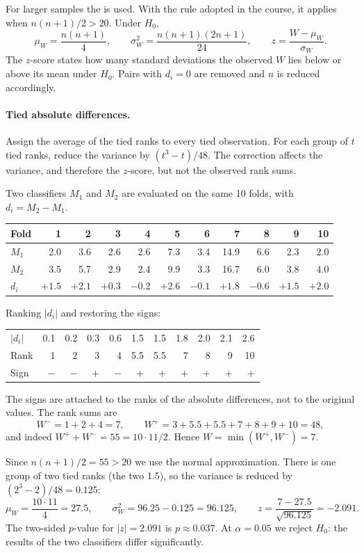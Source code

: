 For larger samples the  is used. With the rule adopted in the course, it applies when $n(n+1)/2 > 20$. Under $H_0$,
\[
  \mu_W = \frac{n(n+1)}{4}, \qquad
  \sigma_W^2 = \frac{n(n+1)(2n+1)}{24}, \qquad
  z = \frac{W - \mu_W}{\sigma_W}.
\]
The $z$-score states how many standard deviations the observed $W$ lies below or above its mean under $H_0$. Pairs with $d_i = 0$ are removed and $n$ is reduced accordingly.

\paragraph{Tied absolute differences.} Assign the average of the tied ranks to every tied observation. For each group of $t$ tied ranks, reduce the variance by $(t^3 - t)/48$. The correction affects the variance, and therefore the $z$-score, but not the observed rank sums.

\begin{example}
Two classifiers $M_1$ and $M_2$ are evaluated on the same 10 folds, with $d_i = M_2 - M_1$.
\begin{center}
\small
\begin{tabular}{lrrrrrrrrrr}
\toprule
Fold & 1 & 2 & 3 & 4 & 5 & 6 & 7 & 8 & 9 & 10 \\
\midrule
$M_1$ & 2.0 & 3.6 & 2.6 & 2.6 & 7.3 & 3.4 & 14.9 & 6.6 & 2.3 & 2.0 \\
$M_2$ & 3.5 & 5.7 & 2.9 & 2.4 & 9.9 & 3.3 & 16.7 & 6.0 & 3.8 & 4.0 \\
$d_i$ & $+1.5$ & $+2.1$ & $+0.3$ & $-0.2$ & $+2.6$ & $-0.1$ & $+1.8$ & $-0.6$ & $+1.5$ & $+2.0$ \\
\bottomrule
\end{tabular}
\end{center}
Ranking $|d_i|$ and restoring the signs:
\begin{center}
\small
\begin{tabular}{lrrrrrrrrrr}
\toprule
$|d_i|$ & 0.1 & 0.2 & 0.3 & 0.6 & 1.5 & 1.5 & 1.8 & 2.0 & 2.1 & 2.6 \\
Rank & 1 & 2 & 3 & 4 & 5.5 & 5.5 & 7 & 8 & 9 & 10 \\
Sign & $-$ & $-$ & $+$ & $-$ & $+$ & $+$ & $+$ & $+$ & $+$ & $+$ \\
\bottomrule
\end{tabular}
\end{center}
The signs are attached to the ranks of the absolute differences, not to the original values. The rank sums are
\[
  W^- = 1 + 2 + 4 = 7, \qquad W^+ = 3 + 5.5 + 5.5 + 7 + 8 + 9 + 10 = 48,
\]
and indeed $W^+ + W^- = 55 = 10 \cdot 11 / 2$. Hence $W = \min(W^+, W^-) = 7$.

Since $n(n+1)/2 = 55 > 20$ we use the normal approximation. There is one group of two tied ranks (the two 1.5), so the variance is reduced by $(2^3 - 2)/48 = 0.125$:
\[
  \mu_W = \frac{10 \cdot 11}{4} = 27.5, \qquad
  \sigma_W^2 = 96.25 - 0.125 = 96.125, \qquad
  z = \frac{7 - 27.5}{\sqrt{96.125}} = -2.091.
\]
The two-sided $p$-value for $|z| = 2.091$ is $p \approx 0.037$. At $\alpha = 0.05$ we reject $H_0$: the results of the two classifiers differ significantly.
\end{example}

